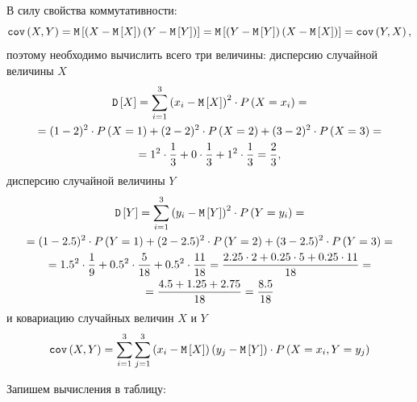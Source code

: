 \begin{enumerate}
    В силу свойства коммутативности:
    \begin{equation}
        \texttt{cov} \left ( X , Y \right )
        = \mathtt{M} \left [ \left ( X - \mathtt{M} \left [ X \right ] \right ) \left ( Y - \mathtt{M} \left [ Y \right ] \right ) \right ]
        = \mathtt{M} \left [ \left ( Y - \mathtt{M} \left [ Y \right ] \right ) \left ( X - \mathtt{M} \left [ X \right ] \right ) \right ]
        = \texttt{cov} \left ( Y , X \right ) ,
    \end{equation}
    поэтому необходимо вычислить всего три величины: дисперсию случайной величины $X$
    \begin{multline}
        \mathtt{D} \left [ X \right ]
        = \sum_{i=1}^3 \left ( x_i - \mathtt{M} \left [ X \right ] \right )^2 \cdot P \left ( X=x_i \right ) = \\
        = ( 1 - 2 )^2 \cdot P \left ( X=1 \right ) + ( 2 - 2 )^2 \cdot P \left ( X=2 \right ) + ( 3 - 2 )^2 \cdot P \left ( X=3 \right ) = \\
        = 1^2 \cdot \frac{1}{3} + 0 \cdot \frac{1}{3} + 1^2 \cdot \frac{1}{3} = \frac{2}{3},
    \end{multline}
    дисперсию случайной величины $Y$
    \begin{multline}
        \mathtt{D} \left [ Y \right ]
        = \sum_{i=1}^3 \left ( y_i - \mathtt{M} \left [ Y \right ] \right )^2 \cdot P \left ( Y=y_i \right ) = \\
        = ( 1 - 2.5 )^2 \cdot P \left ( Y=1 \right ) + ( 2 - 2.5 )^2 \cdot P \left ( Y=2 \right ) + ( 3 - 2.5 )^2 \cdot P \left ( Y=3 \right ) = \\
        = 1.5^2 \cdot \frac{1}{9} + 0.5^2 \cdot \frac{5}{18} + 0.5^2 \cdot \frac{11}{18}
        = \frac{2.25 \cdot 2 + 0.25 \cdot 5 + 0.25 \cdot 11}{18} = \\
        = \frac{4.5 + 1.25 + 2.75}{18}
        = \frac{8.5}{18}
    \end{multline}
    и ковариацию случайных величин $X$ и $Y$
    \begin{equation}
        \texttt{cov} \left ( X , Y \right ) = \sum_{i=1}^3 \sum_{j=1}^3 \left ( x_i - \mathtt{M} \left [ X \right ] \right ) \left ( y_j - \mathtt{M} \left [ Y \right ] \right ) \cdot P \left ( X=x_i, Y=y_j \right )
    \end{equation}

    Запишем вычисления в таблицу:


\end{enumerate}
